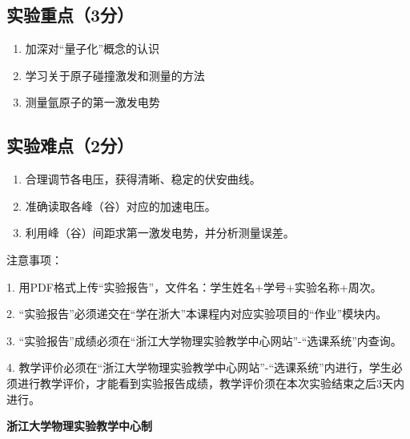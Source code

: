 \documentclass[10pt,a4paper]{ctexart} %
\begin{document}
  \subsection{实验重点（3分）}
  \begin{enumerate}
    \item 加深对“量子化”概念的认识
    \item 学习关于原子碰撞激发和测量的方法
    \item 测量氩原子的第一激发电势
  \end{enumerate}

  \subsection{实验难点（2分）}
  \begin{enumerate}
    \item 合理调节各电压，获得清晰、稳定的伏安曲线。
    \item 准确读取各峰（谷）对应的加速电压。
    \item 利用峰（谷）间距求第一激发电势，并分析测量误差。
  \end{enumerate}

\vspace*{\fill} %
\noindent
\begin{minipage}{\textwidth}
  注意事项：

  \begingroup
    \setlength{\leftskip}{2em} %
    1. 用PDF格式上传“实验报告”，文件名：学生姓名+学号+实验名称+周次。

    2. “实验报告”必须递交在“学在浙大”本课程内对应实验项目的“作业”模块内。

    3. “实验报告”成绩必须在“浙江大学物理实验教学中心网站”-“选课系统”内查询。

    4. 教学评价必须在“浙江大学物理实验教学中心网站”-“选课系统”内进行，学生必须进行教学评价，才能看到实验报告成绩，教学评价须在本次实验结束之后3天内进行。\par
  \endgroup

  \begin{center}
    {\bfseries 浙江大学物理实验教学中心制}
  \end{center}
\end{minipage}
\end{document}
